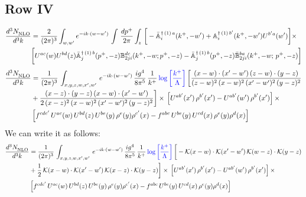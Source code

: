 \documentclass[9pt]{article}
\def\mf#1{\mathbb{#1}}
\numberwithin{equation}{section}
\begin{document}
\subsection{Row IV}
\begin{align}
 \frac{d^{3}N_{\rm NLO}^{\rm}}{d^{3}k}  & = \frac{2}{(2\pi)^{3}}  \int_{w, w^\prime} e^{-ik\cdot (w-w')}\, \int\,\frac{dp^{+}}{2\pi} \int_{z}\,\bigg[-\bar{\mf{A}}^{\dagger\,(1)\,a}_{i}(k^{+},-w^{\prime})+\mf{A}^{\dagger\, (1)\, b^{\prime}}_{i}(k^{+},-w^{\prime})U^{b^{\prime}a}(w^{\prime})\bigg]\times \notag \\ & \bigg[U^{ac}(w)U^{bd}(z) \bar{\mf{A}}^{\dagger\, (1)\, b}_{j}(p^+,- z) {\mf{B}}^{dc}_{2ji} (k^+, -w;p^+, -z) - \Bar{\mf{A}}^{\dagger\, (1)\, b}_{j}(p^{+}, -z)\Bar{\mf{B}}^{ba}_{2ji}(k^{+},-w;\,p^{+}, -z) \bigg] \nonumber
\end{align}
\begin{align}
    \frac{d^{3}N_{\rm NLO}^{\rm}}{d^{3}k}  & =  \frac{1}{(2\pi)^{3}}\,
    \int_{x,y,z,w,x',w'}\,e^{-ik\cdot (w-w^\prime)}\, \frac{ig^{4}}{8\pi^{5}}\,\frac{1}{k^{+}}\,{\color{blue}\log{\left[\frac{k^{+}}{\Lambda}\right]}}\,\bigg[\frac{(x-w)\cdot (x'-w')\,(z-w)\cdot (y-z)}{(z-w)^{2}\,(x-w)^{2}\,(x'-w')^{2}\,(y-z)^{2}}\notag \\ & +\frac{(x-z)\cdot (y-z)\,(x-w)\cdot (x'-w')}{2\, (x-z)^{2}\,(x-w)^{2}\,(x'-w')^{2}\,(y-z)^{2}}\bigg]\times\,\left[U^{ab'}(x')\,\rho^{b'}(x')-U^{ab'}(w')\,\rho^{b'}(x')\right]\times\notag \\ &  \left[f^{cdc'}\,U^{ac}(w)\,U^{bd}(z)\,U^{be}(y)\,\rho^{e}(y)\rho^{c'}(x)-f^{abc}\,U^{be}(y)\,U^{cd}(x)\,\rho^{e}(y)\rho^{d}(x)\right]
\end{align}
We can write it as follows:
\begin{align}
    \frac{d^{3}N_{\rm NLO}^{\rm}}{d^{3}k}  & =  \frac{1}{(2\pi)^{3}}\,
    \int_{x,y,z,w,x',w'}\,e^{-ik\cdot (w-w^\prime)}\, \frac{ig^{4}}{8\pi^{5}}\,\frac{1}{k^{+}}\,{\color{blue}\log{\left[\frac{k^{+}}{\Lambda}\right]}}\,\bigg[-\mathcal{K}(x-w)\cdot \mathcal{K}(x'-w')\, \mathcal{K}(w-z)\cdot \mathcal{K}(y-z)\notag \\ & +\frac{1}{2}\,\mathcal{K}(x-w)\cdot \mathcal{K}(x'-w')\, \mathcal{K}(x-z)\cdot \mathcal{K}(y-z)\bigg]\times\,\left[U^{ab'}(x')\,\rho^{b'}(x')-U^{ab'}(w')\,\rho^{b'}(x')\right]\times\notag \\ &  \left[f^{cdc'}\,U^{ac}(w)\,U^{bd}(z)\,U^{be}(y)\,\rho^{e}(y)\rho^{c'}(x)-f^{abc}\,U^{be}(y)\,U^{cd}(x)\,\rho^{e}(y)\rho^{d}(x)\right]
\end{align}
\end{document}
